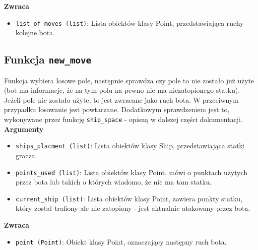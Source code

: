 \documentclass[12pt]{article}
\begin{document}
        \textbf{Zwraca}
            \begin{itemize}
                \item \texttt{list\_of\_moves (list)}: Lista obiektów klasy Point, przedstawiająca ruchy kolejne bota.
            \end{itemize}


    \subsection{Funkcja \texttt{new\_move}}
        Funkcja wybiera losowe pole, następnie sprawdza czy pole to nie zostało już użyte (bot ma informacje, że
        na tym polu na pewno nie ma niezatopionego statku). Jeżeli pole nie zostało użyte, to jest zwracane jako ruch bota.
        W przeciwnym przypadku losowanie jest powtarzane.
        Dodatkowym sprawdzeniem jest to, wykonywane przez funkcję \texttt{ship\_space} - opisną w dalszej części dokumentacji.\\
        \textbf{Argumenty}
            \begin{itemize}
                \item \texttt{ships\_placment (list)}: Lista obiektów klasy Ship, przedstawiająca statki gracza.
                \item \texttt{points\_used (list)}: Lista obiektów klasy Point, mówi o punktach użytych przez bota lub takich o których wiadomo, że nie ma tam statku.
                \item \texttt{current\_ship (list)}: Lista obiektów klasy Point, zawiera punkty statku, który został trafiony ale nie zatopiony - jest aktualnie atakowany przez bota.
            \end{itemize}
        \textbf{Zwraca}
            \begin{itemize}
                \item \texttt{point (Point)}: Obiekt klasy Point, oznaczający następny ruch bota.
            \end{itemize}
\end{document}
